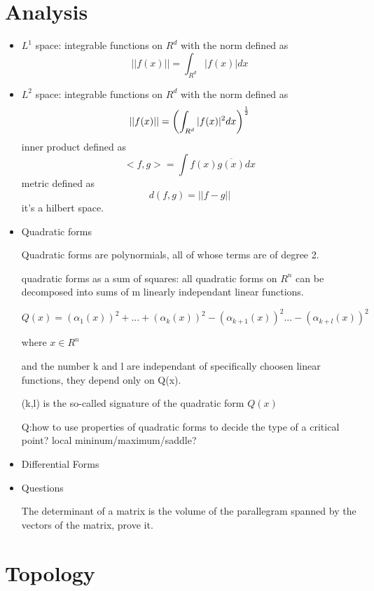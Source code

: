 \documentclass[10pt,a4paper]{book}
\begin{document}
\section{Analysis}
\begin{itemize}
	\item $L^1$ space: integrable functions on $R^d$ with the norm defined as $$ ||f(x)|| = \int_{R^d} |f(x)|dx $$
	
	\item $L^2$ space: integrable functions on $R^d$ with the norm defined as $$ ||f(x)|| = \left( \int_{R^d} |f(x)|^2 dx \right) ^{1 \over 2} $$
	inner product defined as  $$<f,g> = \int f(x) \overline{g(x)} dx$$
	metric defined as $$d(f,g) = ||f-g||$$
	it's a hilbert space.
	
	\item {Quadratic forms}
	
	Quadratic forms are polynormials, all of whose terms are of degree 2. 
	
	quadratic forms as a sum of squares: all quadratic forms on $R^n$ can be decomposed into sums of m linearly independant linear functions. 
	
	$$Q(x) = (\alpha_1(x))^2 + ... + (\alpha_k(x))^2 - (\alpha_{k+1}(x))^2 ... - (\alpha_{k+l}(x))^2$$
	
	where $x \in R^n$
	
	and the number k and l are independant of specifically choosen linear functions, they depend only on Q(x).
	
	(k,l) is the so-called signature of the quadratic form $Q(x)$
	
	Q:how to use properties of quadratic forms to decide the type of a critical point? local mininum/maximum/saddle?
	
	
	\item Differential Forms
	
	\item Questions
	
	The determinant of a matrix is the volume of the parallegram spanned by the vectors of the matrix, prove it.
	
	
	
\end{itemize}

\section{Topology}
\end{document}
